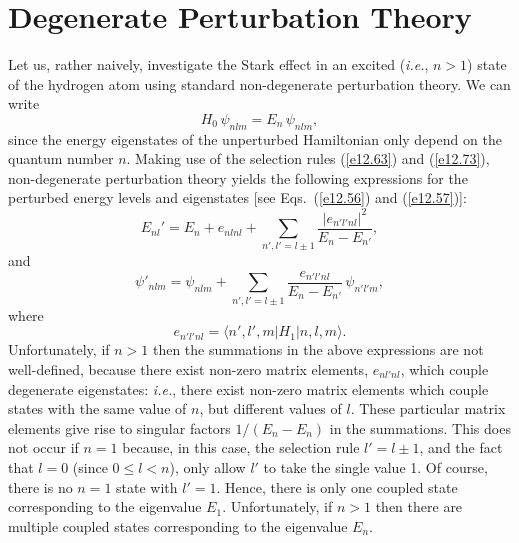 \section{Degenerate Perturbation Theory}\label{s12.6}
Let us, rather naively, investigate the Stark effect in an excited ({\em i.e.}, 
$n>1$) state of the hydrogen atom using standard non-degenerate
perturbation theory. We can write
\begin{equation}
H_0\,\psi_{nlm} = E_n\,\psi_{nlm},
\end{equation}
since the energy eigenstates of the unperturbed Hamiltonian only depend
on the quantum number $n$.  Making use of the selection rules
(\ref{e12.63}) and (\ref{e12.73}), non-degenerate perturbation theory
yields the following expressions for the perturbed energy levels
and eigenstates [see Eqs.~(\ref{e12.56}) and (\ref{e12.57})]:
\begin{equation}\label{e12.88}
E_{nl}' = E_n + e_{nlnl} + \sum_{n',l'=l\pm 1}\frac{|e_{n'l'nl}|^2}{E_n-E_{n'}},
\end{equation}
and
\begin{equation}\label{e12.89}
\psi'_{nlm} = \psi_{nlm} + \sum_{n',l'=l\pm 1}\frac{e_{n'l'nl}}{E_n-E_{n'}}\,\psi_{n'l'm},
\end{equation}
where
\begin{equation}
e_{n'l'nl} = \langle n',l',m|H_1|n,l,m\rangle.
\end{equation}
Unfortunately, if $n>1$ then the summations in the above expressions
are not well-defined, because there exist non-zero matrix elements, $e_{nl'nl}$,  which couple degenerate eigenstates: {\em i.e.}, there exist non-zero matrix elements which couple states with the same value of $n$, but
different values of $l$. These particular matrix elements give rise to
singular factors $1/(E_n-E_n)$ in the summations. This does not occur if
$n=1$ because, in this case, the selection rule $l'=l\pm 1$, and the
fact that $l=0$ (since $0\leq l < n$), only allow $l'$ to take the single value 1.
Of course, there is no $n=1$ state with $l'=1$.
Hence, there is only one coupled state corresponding to the
eigenvalue $E_1$. Unfortunately, if $n>1$ then there are multiple
coupled states corresponding to the eigenvalue $E_n$. 

